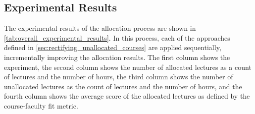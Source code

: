 \subsection{Experimental Results}

The experimental results of the allocation process are shown in \autoref{tab:overall_experimental_results}. In this process, each of the approaches defined in \autoref{sec:rectifying_unallocated_courses} are applied sequentially, incrementally improving the allocation results. The first column shows the experiment, the second column shows the number of allocated lectures as a count of lectures and the number of hours, the third column shows the number of unallocated lectures as the count of lectures and the number of hours, and the fourth column shows the average score of the allocated lectures as defined by the course-faculty fit metric.

\begin{table}[H]
  \centering
  \caption{Experimental Results}
  \label{tab:overall_experimental_results}
\end{table}

